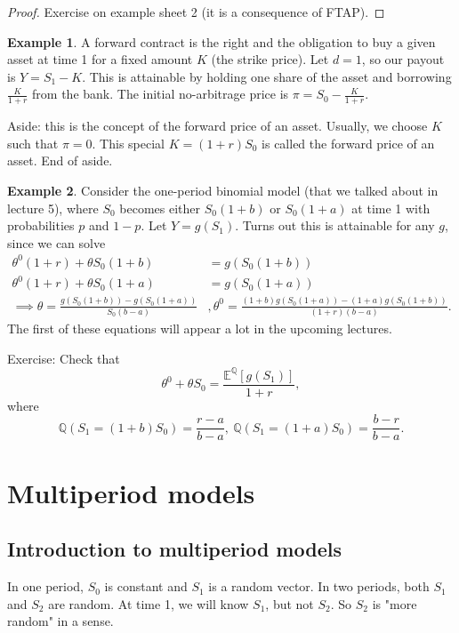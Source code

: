 \documentclass{article}
\theoremstyle{definition}
\newtheorem{example}{Example}[section]
\begin{document}
\begin{proof}
    Exercise on example sheet 2 (it is a consequence of FTAP).
\end{proof}
\begin{example}
    A forward contract is the right and the obligation to buy a given asset at time 1 for a fixed amount $K$ (the strike price). Let $d=1$, so our payout is $Y=S_1 - K$. This is attainable by holding one share of the asset and borrowing $\frac{K}{1+r}$ from the bank. The initial no-arbitrage price is $\pi = S_0 - \frac{K}{1+r}$.
    \vspace{1mm}

    Aside: this is the concept of the forward price of an asset. Usually, we choose $K$ such that $\pi = 0$. This special $K=(1+r)S_0$ is called the forward price of an asset. End of aside.
\end{example}
\begin{example}
    Consider the one-period binomial model (that we talked about in lecture 5), where $S_0$ becomes either $S_0(1+b)$ or $S_0(1+a)$ at time 1 with probabilities $p$ and $1-p$. Let $Y=g(S_1)$. Turns out this is attainable for any $g$, since we can solve 
    \begin{align*}
        \theta^0(1+r) + \theta S_0 (1+b) &= g(S_0(1+b)) \\
        \theta^0(1+r) + \theta S_0 (1+a) &= g(S_0(1+a)) \\
        \implies \theta = \frac{g(S_0(1+b))-g(S_0(1+a))}{S_0(b-a)}&, \theta^0 = \frac{(1+b)g(S_0(1+a))-(1+a)g(S_0(1+b))}{(1+r)(b-a)}.
    \end{align*}
    The first of these equations will appear a lot in the upcoming lectures.

    Exercise: Check that $$\theta^0 + \theta S_0 = \frac{\mathbb{E}^{\mathbb{Q}}[g(S_1)]}{1+r},$$ where $$\mathbb{Q}(S_1=(1+b)S_0) = \frac{r-a}{b-a}, ~\mathbb{Q}(S_1=(1+a)S_0) = \frac{b-r}{b-a}.$$
\end{example}

\section{Multiperiod models}
\subsection{Introduction to multiperiod models}
In one period, $S_0$ is constant and $S_1$ is a random vector. In two periods, both $S_1$ and $S_2$ are random. At time 1, we will know $S_1$, but not $S_2$. So $S_2$ is "more random" in a sense.
\end{document}
